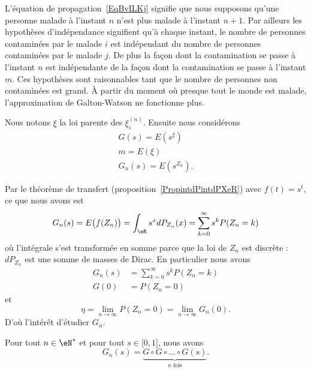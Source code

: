 L'équation de propagation~\ref{EqBvILKj} signifie que nous supposons qu'une personne malade à l'instant \( n\) n'est plus malade à l'instant \( n+1\). Par ailleurs les hypothèses d'indépendance signifient qu'à chaque instant, le nombre de personnes contaminées par le malade \( i\) est indépendant du nombre de personnes contaminées par le malade \( j\). De plus la façon dont la contamination se passe à l'instant \( n\) est indépendante de la façon dont la contamination se passe à l'instant \( m\). Ces hypothèses sont raisonnables tant que le nombre de personnes non contaminées est grand. À partir du moment où presque tout le monde est malade, l'approximation de Galton-Watson ne fonctionne plus.

Nous notons \( \xi\) la loi parente des \( \xi_i^{(n)}\). Ensuite nous considérons
\begin{subequations}
	\begin{align}
		G(s)=E(s^{\xi}) \\
		m=E(\xi)        \\
		G_n(s)=E(s^{Z_n}).
	\end{align}
\end{subequations}

Par le théorème de transfert (proposition~\ref{PropintdPintdPXeR}) avec \( f(t)=s^t\), ce que nous avons est
\begin{equation}        \label{EqNRtXdC}
	G_n(s)=E\big( f(Z_n) \big)=\int_{\eR}s^xdP_{Z_n}(x)=\sum_{k=0}^{\infty}s^kP(Z_n=k)
\end{equation}
où l'intégrale s'est transformée en somme parce que la loi de \( Z_n\) est discrète : \( dP_{Z_n}\) est une somme de masses de Dirac. En particulier nous avons
\begin{subequations}
	\begin{align}
		G_n(s) & =\sum_{k=0}^{\infty}s^kP(Z_n=k) \\
		G(0)   & =P(Z_n=0)
	\end{align}
\end{subequations}
et
\begin{equation}
	\eta=\lim_{n\to \infty} P(Z_n=0)=\lim_{n\to \infty} G_n(0).
\end{equation}
D'où l'intérêt d'étudier \( G_n\).

\begin{lemma}       \label{LemezrOiI}
	Pour tout \( n\in \eN^*\) et pour tout \( s\in\mathopen[ 0 , 1 \mathclose]\), nous avons
	\begin{equation}
		G_n(s)=\underbrace{G\circ G\circ\ldots\circ G(s)}_{ n\text{ fois}}.
	\end{equation}
\end{lemma}

